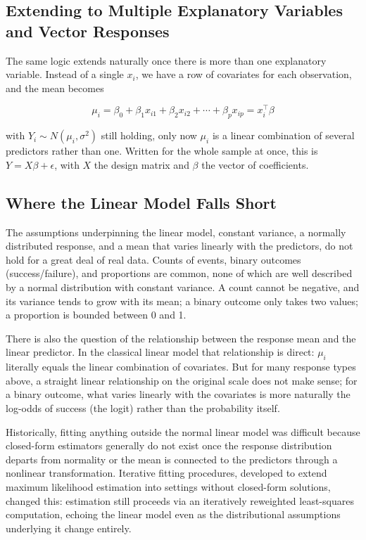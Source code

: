 \subsection*{Extending to Multiple Explanatory Variables and Vector Responses}
The same logic extends naturally once there is more than one explanatory variable. Instead of a single $x_i$, we have a row of covariates for each observation, and the mean becomes
\begin{mathbox}
\[
\mu_i = \beta_0 + \beta_1 x_{i1} + \beta_2 x_{i2} + \cdots + \beta_p x_{ip} = x_i^\top \beta
\]
\end{mathbox}
with $Y_i \sim N(\mu_i,\sigma^2)$ still holding, only now $\mu_i$ is a linear combination of several predictors rather than one. Written for the whole sample at once, this is $Y = X\beta + \epsilon$, with $X$ the design matrix and $\beta$ the vector of coefficients.

\subsection*{Where the Linear Model Falls Short}
The assumptions underpinning the linear model, constant variance, a normally distributed response, and a mean that varies linearly with the predictors, do not hold for a great deal of real data. Counts of events, binary outcomes (success/failure), and proportions are common, none of which are well described by a normal distribution with constant variance. A count cannot be negative, and its variance tends to grow with its mean; a binary outcome only takes two values; a proportion is bounded between 0 and 1.

There is also the question of the relationship between the response mean and the linear predictor. In the classical linear model that relationship is direct: $\mu_i$ literally equals the linear combination of covariates. But for many response types above, a straight linear relationship on the original scale does not make sense; for a binary outcome, what varies linearly with the covariates is more naturally the log-odds of success (the logit) rather than the probability itself.

Historically, fitting anything outside the normal linear model was difficult because closed-form estimators generally do not exist once the response distribution departs from normality or the mean is connected to the predictors through a nonlinear transformation. Iterative fitting procedures, developed to extend maximum likelihood estimation into settings without closed-form solutions, changed this: estimation still proceeds via an iteratively reweighted least-squares computation, echoing the linear model even as the distributional assumptions underlying it change entirely.

